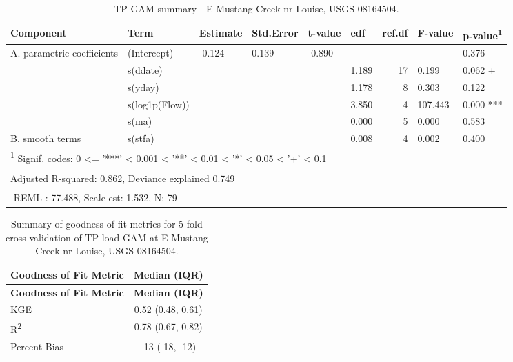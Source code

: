 \documentclass[
]{article}
\newenvironment{widestuff}{\begin{table}[h]\begin{adjustwidth}{-4.5cm}{-4.5cm}\centering}{\end{adjustwidth}\end{table}}
\begin{document}
\begin{widestuff}

\caption{TP GAM summary - E Mustang Creek nr Louise, USGS-08164504.}
\centering
\begin{tabular}[t]{llllllrll}
\toprule
Component & Term & Estimate & Std.Error & t-value & edf & ref.df & F-value & p-value\textsuperscript{1}\\
\midrule
A. parametric coefficients & (Intercept) & -0.124 & 0.139 & -0.890 &  &  &  & 0.376\\
\cmidrule{1-9}
 & s(ddate) &  &  &  & 1.189 & 17 & 0.199 & 0.062 +\\

 & s(yday) &  &  &  & 1.178 & 8 & 0.303 & 0.122\\

 & s(log1p(Flow)) &  &  &  & 3.850 & 4 & 107.443 & 0.000 ***\\

 & s(ma) &  &  &  & 0.000 & 5 & 0.000 & 0.583\\

\multirow[t]{-5}{*}{\raggedright\arraybackslash B. smooth terms} & s(stfa) &  &  &  & 0.008 & 4 & 0.002 & 0.400\\
\bottomrule
\multicolumn{9}{l}{\textsuperscript{1} Signif. codes: 0 <= '***' < 0.001 < '**' < 0.01 < '*' < 0.05 < '+' < 0.1}\\
\multicolumn{9}{l}{\textsuperscript{} Adjusted R-squared: 0.862, Deviance explained 0.749}\\
\multicolumn{9}{l}{\textsuperscript{} -REML : 77.488, Scale est: 1.532, N: 79}\\
\end{tabular}
\end{widestuff}

\hypertarget{tbl-TP08164504-CV}{}
\begin{longtable}[]{@{}lc@{}}
\caption{\label{tbl-TP08164504-CV}Summary of goodness-of-fit metrics for
5-fold cross-validation of TP load GAM at E Mustang Creek nr Louise,
USGS-08164504.}\tabularnewline
\toprule()
\textbf{Goodness of Fit Metric} & \textbf{Median (IQR)} \\
\midrule()
\endfirsthead
\toprule()
\textbf{Goodness of Fit Metric} & \textbf{Median (IQR)} \\
\midrule()
\endhead
KGE & 0.52 (0.48, 0.61) \\
R\textsuperscript{2} & 0.78 (0.67, 0.82) \\
Percent Bias & -13 (-18, -12) \\
\bottomrule()
\end{longtable}
\end{document}
